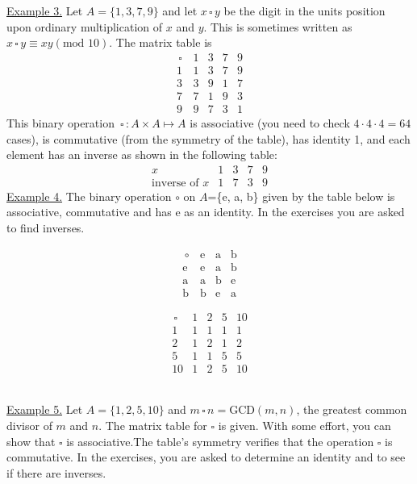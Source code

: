 \documentclass[12pt]{article}
\theoremstyle{definition}
\begin{document}
\underline{Example 3.} Let $A=\{1,3,7,9\}$ and let $x\,\square\, y$ be the digit in the units position upon ordinary multiplication of $x$ and $y$.  This is sometimes written as $x\,\square\, y \equiv xy(\text{mod }10)$.  The matrix table is
$$\begin{array}{c|cccc}
\,\square\, & 1 & 3 & 7 & 9\\
\hline
1 & 1 & 3 & 7& 9\\
3 & 3 & 9 & 1& 7\\
7 & 7 & 1 & 9 & 3\\
9 & 9 & 7 & 3 & 1
\end{array}$$
This binary operation $\,\square\,:A\times A\mapsto A$ is associative (you need to check $4\cdot4\cdot4=64$ cases), is commutative (from the symmetry of the table), has identity 1, and each element has an inverse as shown in the following table:
$$\begin{array}{c|cccc}
x & 1 & 3 & 7 & 9\\
\hline
\text{inverse of }x & 1 & 7 & 3 & 9
\end{array}$$%
%
\underline{Example 4.} The binary operation $\circ$ on $A$=\{e, a, b\} given by the table below is associative, commutative and has e as an identity.  In the exercises you are asked to find inverses.\\
\begin{minipage}{2in}
$$\begin{array}{c|ccc}
\,\circ\, & \text{e} &\text{a} & \text{b}\\
\hline
\text{e} & \text{e} & \text{a} & \text{b}\\
\text{a} & \text{a} & \text{b} & \text{e}\\
\text{b} & \text{b} & \text{e} & \text{a}
\end{array}$$
\end{minipage}
\begin{minipage}{3.5in}
$$\begin{array}{c|cccc}
\,\square\, & 1 & 2 & 5& 10\\
\hline
1 & 1 & 1 & 1 &1\\
2 & 1 & 2 & 1 & 2\\
5 & 1 & 1 & 5 & 5\\
10 & 1 & 2 & 5 & 10
\end{array}$$
\end{minipage}\\[.1in]
\underline{Example 5.}  Let $A=\{1,2,5,10\}$ and $m\,\square\, n = \text{GCD}(m,n)$, the greatest common divisor of $m$ and $n$.  The matrix table for $\square$ is given.  With some effort, you can show that $\square$ is associative.The table's symmetry verifies that the operation $\square$ is commutative.  In the exercises, you are asked to determine an identity and to see if there are inverses.\\[.1in]
\end{document}

